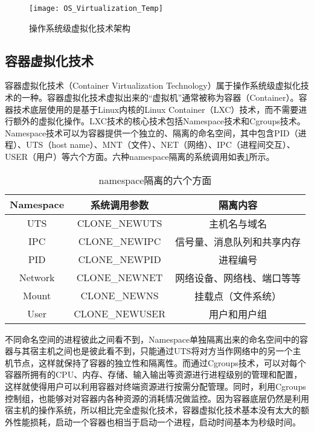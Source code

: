 \begin{figure}[!htbp]
    \centering
    \texttt{[image: OS\_Virtualization\_Temp]}
    \caption{操作系统级虚拟化技术架构}
    \label{fig:os_virtualization}
\end{figure}

\subsection{容器虚拟化技术}

容器虚拟化技术（Container Virtualization Technology）属于操作系统级虚拟化技术的一种\citep{vaughan2006new}。容器虚拟化技术虚拟出来的“虚拟机”通常被称为容器（Container）。容器技术底层使用的是基于Linux内核的Linux Container（LXC）技术，而不需要进行额外的虚拟化操作\cite{celesti2016exploring}。LXC技术的核心技术包括Namespace技术和Cgroups技术\cite{肖伟民2019嵌入式虚拟化}。Namespace技术可以为容器提供一个独立的、隔离的命名空间，其中包含PID（进程）、UTS（host name）、MNT（文件）、NET（网络）、IPC（进程间交互）、USER（用户）等六个方面\cite{liu2014researchandimplementation}。六种namespace隔离的系统调用如表\ref{tab:namespace_system}所示。

\begin{table}[!htbp]
    \centering
    \caption{namespace隔离的六个方面}\label{tab:namespace_system}
    \renewcommand\arraystretch{1.5} 
\begin{tabular}{*{3}{c}}
    \hline
    Namespace & 系统调用参数& 隔离内容\\
    \hline
    UTS & CLONE\_NEWUTS & 主机名与域名 \\
    IPC	& CLONE\_NEWIPC & 信号量、消息队列和共享内存\\
    PID & CLONE\_NEWPID & 进程编号\\
    Network & CLONE\_NEWNET & 网络设备、网络栈、端口等等 \\
    Mount & CLONE\_NEWNS & 挂载点（文件系统）\\
    User & CLONE\_NEWUSER & 用户和用户组\\
    \hline
   \end{tabular}
\end{table}

不同命名空间的进程彼此之间看不到，Namespace单独隔离出来的命名空间中的容器与其宿主机之间也是彼此看不到，只能通过UTS将对方当作网络中的另一个主机节点，这样就保持了容器的独立性和隔离性。而通过Cgroups技术，可以对每个容器所拥有的CPU、内存、存储、输入输出等资源进行进程级别的管理和配置，这样就使得用户可以利用容器对终端资源进行按需分配管理。同时，利用Cgroups控制组，也能够对对容器内各种资源的消耗情况做监控。因为容器底层仍然是利用宿主机的操作系统，所以相比完全虚拟化技术，容器虚拟化技术基本没有太大的额外性能损耗，启动一个容器也相当于启动一个进程，启动时间基本为秒级时间。


